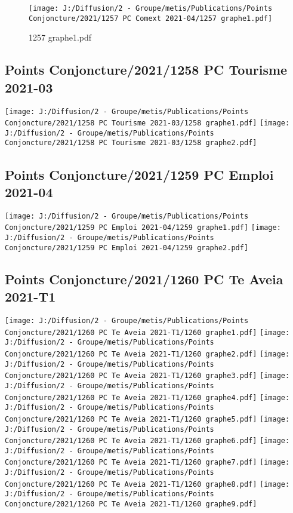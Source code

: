 \documentclass[
]{article}
\begin{document}
\begin{figure}
\centering
\texttt{[image: J:/Diffusion/2 - Groupe/metis/Publications/Points Conjoncture/2021/1257 PC Comext 2021-04/1257 graphe1.pdf]}
\caption{1257 graphe1.pdf}
\end{figure}

\hypertarget{points-conjoncture20211258-pc-tourisme-2021-03}{%
\subsection{Points Conjoncture/2021/1258 PC Tourisme
2021-03}\label{points-conjoncture20211258-pc-tourisme-2021-03}}

\texttt{[image: J:/Diffusion/2 - Groupe/metis/Publications/Points Conjoncture/2021/1258 PC Tourisme 2021-03/1258 graphe1.pdf]}
\texttt{[image: J:/Diffusion/2 - Groupe/metis/Publications/Points Conjoncture/2021/1258 PC Tourisme 2021-03/1258 graphe2.pdf]}

\hypertarget{points-conjoncture20211259-pc-emploi-2021-04}{%
\subsection{Points Conjoncture/2021/1259 PC Emploi
2021-04}\label{points-conjoncture20211259-pc-emploi-2021-04}}

\texttt{[image: J:/Diffusion/2 - Groupe/metis/Publications/Points Conjoncture/2021/1259 PC Emploi 2021-04/1259 graphe1.pdf]}
\texttt{[image: J:/Diffusion/2 - Groupe/metis/Publications/Points Conjoncture/2021/1259 PC Emploi 2021-04/1259 graphe2.pdf]}

\hypertarget{points-conjoncture20211260-pc-te-aveia-2021-t1}{%
\subsection{Points Conjoncture/2021/1260 PC Te Aveia
2021-T1}\label{points-conjoncture20211260-pc-te-aveia-2021-t1}}

\texttt{[image: J:/Diffusion/2 - Groupe/metis/Publications/Points Conjoncture/2021/1260 PC Te Aveia 2021-T1/1260 graphe1.pdf]}
\texttt{[image: J:/Diffusion/2 - Groupe/metis/Publications/Points Conjoncture/2021/1260 PC Te Aveia 2021-T1/1260 graphe2.pdf]}
\texttt{[image: J:/Diffusion/2 - Groupe/metis/Publications/Points Conjoncture/2021/1260 PC Te Aveia 2021-T1/1260 graphe3.pdf]}
\texttt{[image: J:/Diffusion/2 - Groupe/metis/Publications/Points Conjoncture/2021/1260 PC Te Aveia 2021-T1/1260 graphe4.pdf]}
\texttt{[image: J:/Diffusion/2 - Groupe/metis/Publications/Points Conjoncture/2021/1260 PC Te Aveia 2021-T1/1260 graphe5.pdf]}
\texttt{[image: J:/Diffusion/2 - Groupe/metis/Publications/Points Conjoncture/2021/1260 PC Te Aveia 2021-T1/1260 graphe6.pdf]}
\texttt{[image: J:/Diffusion/2 - Groupe/metis/Publications/Points Conjoncture/2021/1260 PC Te Aveia 2021-T1/1260 graphe7.pdf]}
\texttt{[image: J:/Diffusion/2 - Groupe/metis/Publications/Points Conjoncture/2021/1260 PC Te Aveia 2021-T1/1260 graphe8.pdf]}
\texttt{[image: J:/Diffusion/2 - Groupe/metis/Publications/Points Conjoncture/2021/1260 PC Te Aveia 2021-T1/1260 graphe9.pdf]}
\end{document}
